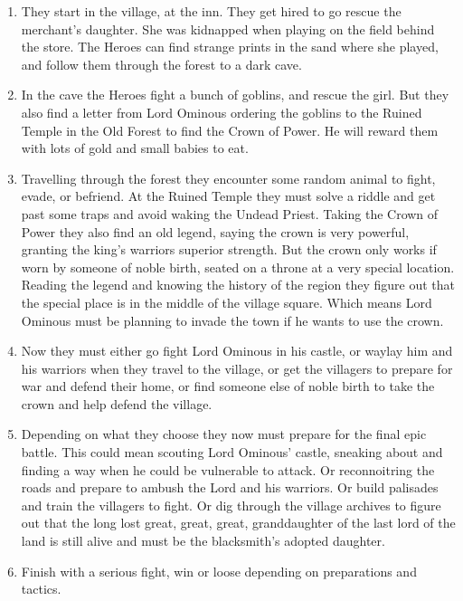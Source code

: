 \begin{enumerate}

\item They start in the village, at the inn. They get hired to go rescue the merchant's daughter. She was kidnapped when playing on the field behind the store. The Heroes can find strange prints in the sand where she played, and follow them through the forest to a dark cave.

\item In the cave the Heroes fight a bunch of goblins, and rescue the girl. But they also find a letter from Lord Ominous ordering the goblins to the Ruined Temple in the Old Forest to find the Crown of Power. He will reward them with lots of gold and small babies to eat.

\item Travelling through the forest they encounter some random animal to fight, evade, or befriend. At the Ruined Temple they must solve a riddle and get past some traps and avoid waking the Undead Priest.
Taking the Crown of Power they also find an old legend, saying the crown is very powerful, granting the king's warriors superior strength. But the crown only works if worn by someone of noble birth, seated on a throne at a very special location. Reading the legend and knowing the history of the region they figure out that the special place is in the middle of the village square. Which means Lord Ominous must be planning to invade the town if he wants to use the crown.

\item Now they must either go fight Lord Ominous in his castle, or waylay him and his warriors when they travel to the village, or get the villagers to prepare for war and defend their home, or find someone else of noble birth to take the crown and help defend the village.

\item Depending on what they choose they now must prepare for the final epic battle. This could mean scouting Lord Ominous' castle, sneaking about and finding a way when he could be vulnerable to attack. Or reconnoitring the roads and prepare to ambush the Lord and his warriors. Or build palisades and train the villagers to fight. Or dig through the village archives to figure out that the long lost great, great, great, granddaughter of the last lord of the land is still alive and must be the blacksmith's adopted daughter.

\item Finish with a serious fight, win or loose depending on preparations and tactics.

\end{enumerate}


